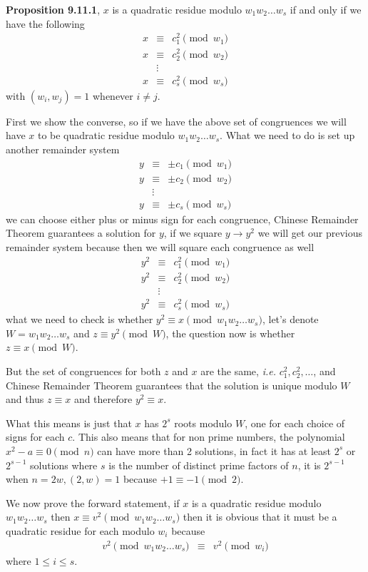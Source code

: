 \documentclass[aps,preprint,preprintnumbers,nofootinbib,showpacs,prd]{revtex4-1}
\newcommand{\ie}{{\it i.e.} }
\newcommand{\nbea}{\begin{eqnarray*}}
\newcommand{\neea}{\end{eqnarray*}}
\begin{document}
{\bf Proposition 9.11.1}, $x$ is a quadratic residue modulo  $w_1 w_2 \dots w_s$ if and only if we have the following
%
\nbea
x & \equiv & c^2_1 \pmod{w_1} \\
x & \equiv & c^2_2 \pmod{w_2} \\
& \vdots & \\
x & \equiv & c^2_s \pmod{w_s}
\neea
%
with $(w_i, w_j) = 1$ whenever $i \neq j$.

First we show the converse, so if we have the above set of congruences we will have $x$ to be quadratic residue modulo  $w_1 w_2 \dots w_s$. What we need to do is set up another remainder system
%
\nbea
y & \equiv & \pm c_1 \pmod{w_1} \\
y & \equiv & \pm c_2 \pmod{w_2} \\
& \vdots & \\
y & \equiv & \pm c_s \pmod{w_s}
\neea
%
we can choose either plus or minus sign for each congruence, Chinese Remainder Theorem guarantees a solution for $y$, if we square $y \to y^2$ we will get our previous remainder system because then we will square each congruence as well
%
\nbea
y^2 & \equiv & c^2_1 \pmod{w_1} \\
y^2 & \equiv & c^2_2 \pmod{w_2} \\
& \vdots & \\
y^2 & \equiv & c^2_s \pmod{w_s}
\neea
%
what we need to check is whether $y^2 \equiv x \pmod{w_1w_2 \dots w_s}$, let's denote $W = w_1w_2 \dots w_s$ and $z \equiv y^2 \pmod{W}$, the question now is whether $z \equiv x \pmod{W}$.

But the set of congruences for both $z$ and $x$ are the same, \ie $c^2_1, c^2_2, \dots$, and Chinese Remainder Theorem guarantees that the solution is unique modulo $W$ and thus $z \equiv x$ and therefore $y^2 \equiv x$.

What this means is just that $x$ has $2^s$ roots modulo $W$, one for each choice of signs for each $c$. This also means that for non prime numbers, the polynomial $x^2 - a \equiv 0 \pmod{n}$ can have more than 2 solutions, in fact it has at least $2^s$ or $2^{s-1}$ solutions where $s$ is the number of distinct prime factors of $n$, it is $2^{s-1}$ when $n = 2w, (2,w)=1$ because $+1 \equiv -1 \pmod{2}$.

We now prove the forward statement, if $x$ is a quadratic residue modulo $w_1 w_2 \dots w_s$ then $x \equiv v^2 \pmod{w_1 w_2 \dots w_s}$ then it is obvious that it must be a quadratic residue for each modulo $w_i$ because
%
\nbea
v^2 \pmod{w_1 w_2 \dots w_s} & \equiv & v^2 \pmod{w_i}
\neea
%
where $1 \le i \le s$.
\end{document}
